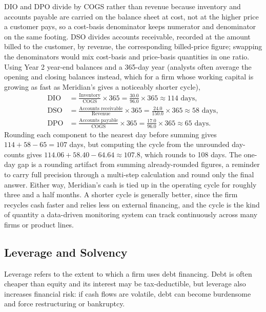 \documentclass[../ai_in_finance]{subfiles}
\begin{document}
DIO and DPO divide by COGS rather than revenue because inventory and accounts payable are carried on the balance sheet at cost, not at the higher price a customer pays, so a cost-basis denominator keeps numerator and denominator on the same footing.
DSO divides accounts receivable, recorded at the amount billed to the customer, by revenue, the corresponding billed-price figure; swapping the denominators would mix cost-basis and price-basis quantities in one ratio. Using Year 2 year-end balances and a 365-day year (analysts often average the opening and closing balances instead, which for a firm whose working capital is growing as fast as Meridian's gives a noticeably shorter cycle),
\begin{align*}
\text{DIO} &= \frac{\text{Inventory}}{\text{COGS}} \times 365 = \frac{30.0}{96.0}\times 365 \approx 114 \text{ days}, \\
\text{DSO} &= \frac{\text{Accounts receivable}}{\text{Revenue}} \times 365 = \frac{24.0}{150.0}\times 365 \approx 58 \text{ days}, \\
\text{DPO} &= \frac{\text{Accounts payable}}{\text{COGS}} \times 365 = \frac{17.0}{96.0}\times 365 \approx 65 \text{ days}.
\end{align*}
Rounding each component to the nearest day before summing gives $114 + 58 - 65 = 107$ days, but computing the cycle from the unrounded day-counts gives $114.06 + 58.40 - 64.64 \approx 107.8$, which rounds to 108 days. The one-day gap is a rounding artifact from summing already-rounded figures, a reminder to carry full precision through a multi-step calculation and round only the final answer. Either way, Meridian's cash is tied up in the operating cycle for roughly three and a half months. A shorter cycle is generally better, since the firm recycles cash faster and relies less on external financing, and the cycle is the kind of quantity a data-driven monitoring system can track continuously across many firms or product lines.

\subsection{Leverage and Solvency}
\label{sec:statements-leverage}

Leverage refers to the extent to which a firm uses debt financing. Debt is often cheaper than equity and its interest may be tax-deductible, but leverage also increases financial risk: if cash flows are volatile, debt can become burdensome and force restructuring or bankruptcy.
\end{document}
